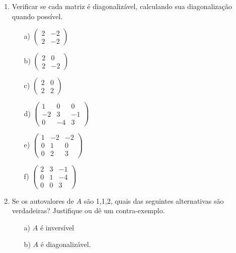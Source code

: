 \documentclass[12pt]{article}
\begin{document}
\begin{enumerate}
\item Verificar se cada matriz é diagonalizável, calculando sua diagonalização quando possível.
\begin{center}
   \begin{minipage}{0.4\textwidth}
      \begin{itemize}
         \item[a)] $\begin{pmatrix} 2 & -2\\2 & -2\end{pmatrix}$
         \item[b)] $\begin{pmatrix}2 & 0\\2 & -2\end{pmatrix}$
         \item[c)] $\begin{pmatrix} 2 & 0\\2 & 2\end{pmatrix}$
      \end{itemize}
   \end{minipage}
   \begin{minipage}{0.4\textwidth}
      \begin{itemize}
         \item[d)] $\begin{pmatrix} 1 & 0 & 0\\-2 & 3& -1\\0 & -4 & 3\end{pmatrix}$
         \item[e)] $\begin{pmatrix} 1 & -2 & -2\\0 & 1 & 0\\0 & 2 & 3\end{pmatrix}$
         \item[f)] $\begin{pmatrix} 2 & 3 & -1\\0 & 1 & -4\\0 & 0 & 3\end{pmatrix}$
      \end{itemize}
   \end{minipage}
\end{center}

\item Se os autovalores de $A$ são 1,1,2, quais das seguintes alternativas são verdadeiras? Justifique ou dê um contra-exemplo.
  \begin{itemize}
  \item[a)] $A$ é inversível
  \item[b)] $A$ é diagonalizável.
  \end{itemize}


\end{enumerate}
\end{document}
